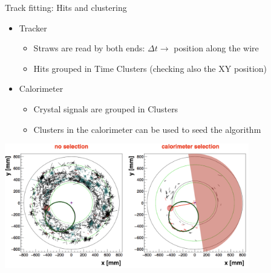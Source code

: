 \documentclass[10pt]{beamer}
\begin{document}
%
\begin{frame}{Track fitting: Hits and clustering}
\begin{itemize}
\item Tracker
\begin{itemize}
\item Straws are read by both ends: $\Delta t \rightarrow$ position along the wire
\item Hits grouped in Time Clusters (checking also the XY position)
\end{itemize}
\item Calorimeter
\begin{itemize}
\item Crystal signals are grouped in Clusters
\item Clusters in the calorimeter can be used to seed the algorithm
\end{itemize}
\end{itemize}
\centering
\includegraphics[width=0.8\textwidth]{giani_CalPatRec_semiplane}
\end{frame}
\end{document}
